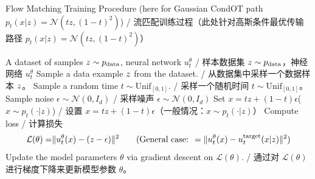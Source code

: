 \begin{algorithm}[h]
\caption{Flow Matching Training Procedure (here for Gaussian CondOT path $p_t(x|z)=\mathcal{N}(tz,(1-t)^2)$) / 流匹配训练过程（此处针对高斯条件最优传输路径 $p_t(x|z)=\mathcal{N}(tz,(1-t)^2)$）}
\label{alg:training_fm_score_matching_gaussian_paths}
\begin{algorithmic}[1]
\REQUIRE A dataset of samples $z\sim p_{\rm{data}}$, neural network $u_t^\theta$ / 样本数据集 $z\sim p_{\rm{data}}$，神经网络 $u_t^\theta$
    \STATE Sample a data example $z$ from the dataset. / 从数据集中采样一个数据样本 $z$。
    \STATE Sample a random time $t \sim \text{Unif}_{[0,1]}$. / 采样一个随机时间 $t \sim \text{Unif}_{[0,1]}$。
    \STATE Sample noise $\epsilon\sim\mathcal{N}(0,I_d)$ / 采样噪声 $\epsilon\sim\mathcal{N}(0,I_d)$
    \STATE Set $x=t z + (1-t) \epsilon$\hfill ($x\sim p_t(\cdot|z)$) / 设置 $x=t z + (1-t) \epsilon$\hfill （一般情况：$x\sim p_t(\cdot|z)$）
    \STATE Compute loss / 计算损失
    \begin{align*}
        \mathcal{L}(\theta) =& \|u_t^\theta(x)-(z-\epsilon)\|^2 \quad &(\text{General case: }=\|u_t^\theta(x)-u^{\text{target}}_t(x|z)\|^2)
    \end{align*}
    \STATE Update the model parameters $\theta$ via gradient descent on $\mathcal{L}(\theta)$. / 通过对 $\mathcal{L}(\theta)$ 进行梯度下降来更新模型参数 $\theta$。
\ENDFOR
\end{algorithmic}
\end{algorithm}

